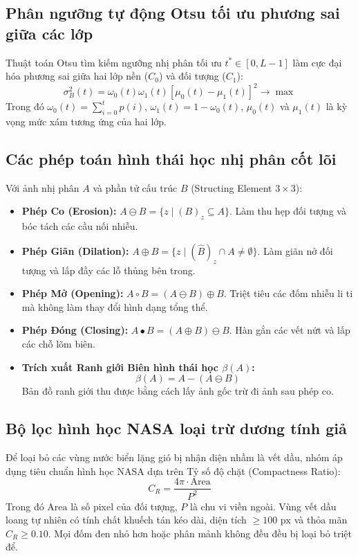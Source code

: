 \subsection{Phân ngưỡng tự động Otsu tối ưu phương sai giữa các lớp}
Thuật toán Otsu \cite{otsu1979threshold} tìm kiếm ngưỡng nhị phân tối ưu $t^* \in [0, L-1]$ làm cực đại hóa phương sai giữa hai lớp nền ($C_0$) và đối tượng ($C_1$):
\begin{equation}
\sigma_B^2(t) = \omega_0(t) \omega_1(t) \left[ \mu_0(t) - \mu_1(t) \right]^2 \to \max
\label{eq:otsu}
\end{equation}
Trong đó $\omega_0(t) = \sum_{i=0}^t p(i)$, $\omega_1(t) = 1 - \omega_0(t)$, $\mu_0(t)$ và $\mu_1(t)$ là kỳ vọng mức xám tương ứng của hai lớp.

\subsection{Các phép toán hình thái học nhị phân cốt lõi}
Với ảnh nhị phân $A$ và phần tử cấu trúc $B$ (Structing Element $3 \times 3$):
\begin{itemize}
    \item \textbf{Phép Co (Erosion):} $A \ominus B = \{ z \mid (B)_z \subseteq A \}$. Làm thu hẹp đối tượng và bóc tách các cầu nối nhiễu.
    \item \textbf{Phép Giãn (Dilation):} $A \oplus B = \{ z \mid (\hat{B})_z \cap A \neq \emptyset \}$. Làm giãn nở đối tượng và lấp đầy các lỗ thủng bên trong.
    \item \textbf{Phép Mở (Opening):} $A \circ B = (A \ominus B) \oplus B$. Triệt tiêu các đốm nhiễu li ti mà không làm thay đổi hình dạng tổng thể.
    \item \textbf{Phép Đóng (Closing):} $A \bullet B = (A \oplus B) \ominus B$. Hàn gắn các vết nứt và lấp các chỗ lõm biên.
    \item \textbf{Trích xuất Ranh giới Biên hình thái học $\beta(A)$:}
    \begin{equation}
    \beta(A) = A - (A \ominus B)
    \label{eq:boundary}
    \end{equation}
    Bản đồ ranh giới thu được bằng cách lấy ảnh gốc trừ đi ảnh sau phép co.
\end{itemize}

\subsection{Bộ lọc hình học NASA loại trừ dương tính giả}
Để loại bỏ các vùng nước biển lặng gió bị nhận diện nhầm là vết dầu, nhóm áp dụng tiêu chuẩn hình học NASA dựa trên Tỷ số độ chặt (Compactness Ratio):
\begin{equation}
C_R = \frac{4\pi \cdot \text{Area}}{P^2}
\label{eq:compactness}
\end{equation}
Trong đó $\text{Area}$ là số pixel của đối tượng, $P$ là chu vi viền ngoài. Vùng vết dầu loang tự nhiên có tính chất khuếch tán kéo dài, diện tích $\ge 100\text{ px}$ và thỏa mãn $C_R \ge 0.10$. Mọi đốm đen nhỏ hơn hoặc phân mảnh không đều đều bị loại bỏ triệt để.



